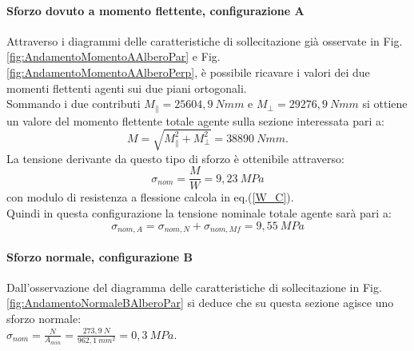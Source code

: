 \paragraph{Sforzo dovuto a momento flettente, configurazione A} 
Attraverso i diagrammi delle caratteristiche di sollecitazione già osservate in Fig.\ref{fig:AndamentoMomentoAAlberoPar} e Fig.\ref{fig:AndamentoMomentoAAlberoPerp}, è possibile ricavare i valori dei due momenti flettenti agenti sui due piani ortogonali.\\ 
Sommando i due contributi $M_{\parallel}=25604,9\ Nmm$ e $M_{\perp}=29276,9\ Nmm$ si ottiene un valore del momento flettente totale agente sulla sezione interessata pari a:
\begin{equation}
    M=\sqrt{M_{\parallel}^2+M_{\perp}^2}=38890\ Nmm.
\end{equation}
La tensione derivante da questo tipo di sforzo è ottenibile attraverso:
\begin{equation}
    \sigma_{nom}=\frac{M}{W}=9,23\ MPa
\end{equation}
con modulo di resistenza a flessione calcola in eq.(\ref{W_C}).\\
Quindi in questa configurazione la tensione nominale totale agente sarà pari a:
\begin{equation}
    \sigma_{nom,A}=\sigma_{nom,N}+\sigma_{nom,Mf}=9,55\ MPa
\end{equation}

\paragraph{Sforzo normale, configurazione B} Dall'osservazione del diagramma delle caratteristiche di sollecitazione in Fig.\ref{fig:AndamentoNormaleBAlberoPar} si deduce che su questa sezione agisce uno sforzo normale:\\
$\sigma_{nom}=\frac{N}{A_{min}}=\frac{273,9\ N}{962,1\ mm^2}=0,3\ MPa$.
